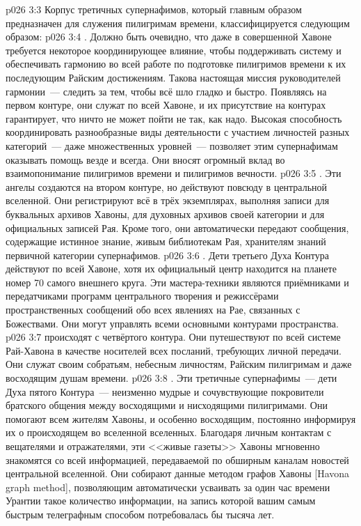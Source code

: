 \vs p026 3:3 \pc Корпус третичных супернафимов, который главным образом предназначен для служения пилигримам времени, классифицируется следующим образом:
\vs p026 3:4 . Должно быть очевидно, что даже в совершенной Хавоне требуется некоторое координирующее влияние, чтобы поддерживать систему и обеспечивать гармонию во всей работе по подготовке пилигримов времени к их последующим Райским достижениям. Такова настоящая миссия руководителей гармонии~--- следить за тем, чтобы всё шло гладко и быстро. Появляясь на первом контуре, они служат по всей Хавоне, и их присутствие на контурах гарантирует, что ничто не может пойти не так, как надо. Высокая способность координировать разнообразные виды деятельности с участием личностей разных категорий~--- даже множественных уровней~--- позволяет этим супернафимам оказывать помощь везде и всегда. Они вносят огромный вклад во взаимопонимание пилигримов времени и пилигримов вечности.
\vs p026 3:5 . Эти ангелы создаются на втором контуре, но действуют повсюду в центральной вселенной. Они регистрируют всё в трёх экземплярах, выполняя записи для буквальных архивов Хавоны, для духовных архивов своей категории и для официальных записей Рая. Кроме того, они автоматически передают сообщения, содержащие истинное знание, живым библиотекам Рая, хранителям знаний первичной категории супернафимов.
\vs p026 3:6 . Дети третьего Духа Контура действуют по всей Хавоне, хотя их официальный центр находится на планете номер 70 самого внешнего круга. Эти мастера\hyp{}техники являются приёмниками и передатчиками программ центрального творения и режиссёрами пространственных сообщений обо всех явлениях на Рае, связанных с Божествами. Они могут управлять всеми основными контурами пространства.
\vs p026 3:7  происходят с четвёртого контура. Они путешествуют по всей системе Рай\hyp{}Хавона в качестве носителей всех посланий, требующих личной передачи. Они служат своим собратьям, небесным личностям, Райским пилигримам и даже восходящим душам времени.
\vs p026 3:8 . Эти третичные супернафимы~--- дети Духа пятого Контура~--- неизменно мудрые и сочувствующие покровители братского общения между восходящими и нисходящими пилигримами. Они помогают всем жителям Хавоны, и особенно восходящим, постоянно информируя их о происходящем во вселенной вселенных. Благодаря личным контактам с вещателями и отражателями, эти <<живые газеты>> Хавоны мгновенно знакомятся со всей информацией, передаваемой по обширным каналам новостей центральной вселенной. Они собирают данные методом графов Хавоны [Havona graph method], позволяющим автоматически усваивать за один час времени Урантии такое количество информации, на запись которой вашим самым быстрым телеграфным способом потребовалась бы тысяча лет.

